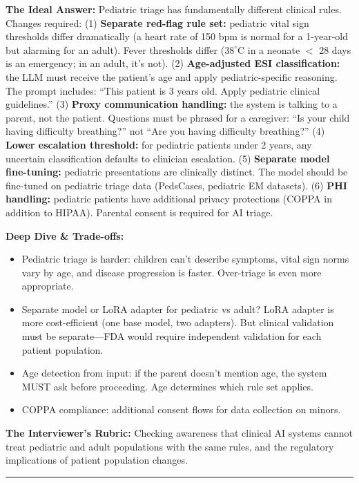 \textbf{The Ideal Answer:} Pediatric triage has fundamentally different clinical rules. Changes required: (1) \textbf{Separate red-flag rule set:} pediatric vital sign thresholds differ dramatically (a heart rate of 150 bpm is normal for a 1-year-old but alarming for an adult). Fever thresholds differ ($38^{\circ}$C in a neonate $<$ 28 days is an emergency; in an adult, it's not). (2) \textbf{Age-adjusted ESI classification:} the LLM must receive the patient's age and apply pediatric-specific reasoning. The prompt includes: ``This patient is 3 years old. Apply pediatric clinical guidelines.'' (3) \textbf{Proxy communication handling:} the system is talking to a parent, not the patient. Questions must be phrased for a caregiver: ``Is your child having difficulty breathing?'' not ``Are you having difficulty breathing?'' (4) \textbf{Lower escalation threshold:} for pediatric patients under 2 years, any uncertain classification defaults to clinician escalation. (5) \textbf{Separate model fine-tuning:} pediatric presentations are clinically distinct. The model should be fine-tuned on pediatric triage data (PedsCases, pediatric EM datasets). (6) \textbf{PHI handling:} pediatric patients have additional privacy protections (COPPA in addition to HIPAA). Parental consent is required for AI triage.

\textbf{Deep Dive \& Trade-offs:}
\begin{itemize}
  \item Pediatric triage is harder: children can't describe symptoms, vital sign norms vary by age, and disease progression is faster. Over-triage is even more appropriate.
  \item Separate model or LoRA adapter for pediatric vs adult? LoRA adapter is more cost-efficient (one base model, two adapters). But clinical validation must be separate---FDA would require independent validation for each patient population.
  \item Age detection from input: if the parent doesn't mention age, the system MUST ask before proceeding. Age determines which rule set applies.
  \item COPPA compliance: additional consent flows for data collection on minors.
\end{itemize}

\textbf{The Interviewer's Rubric:} Checking awareness that clinical AI systems cannot treat pediatric and adult populations with the same rules, and the regulatory implications of patient population changes.

\bigskip\hrule\bigskip

